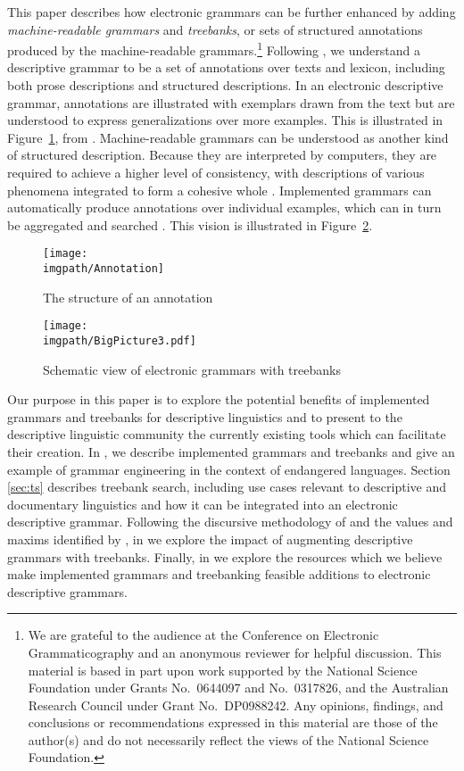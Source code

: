 This paper describes how electronic grammars can be further enhanced by
adding {\it machine-readable grammars} and {\it treebanks}, or sets of
structured annotations produced by the machine-readable
grammars.\footnote{We are grateful to the audience at the Conference on
  Electronic Grammaticography and an anonymous reviewer for helpful
  discussion.  This material is based in part upon work supported by the
  National Science Foundation under Grants No.\ 0644097 and No.\
  0317826, and the Australian Research Council under Grant No.\
  DP0988242.  Any opinions, findings, and conclusions or recommendations
  expressed in this material are those of the author(s) and do not
  necessarily reflect the views of the National Science Foundation.  }
Following \namecite{Good:04}, we understand a descriptive grammar to be
a set of annotations over texts and lexicon, including both prose
descriptions and structured descriptions.  In an electronic descriptive
grammar, annotations are illustrated with exemplars drawn from the text
but are understood to express generalizations over more examples.  This
is illustrated in Figure~\ref{fig:good}, from \citeboth{Good:04}.
Machine-readable grammars can be understood as another kind of
structured description.  Because they are interpreted by computers, they
are required to achieve a higher level of consistency, with descriptions
of various phenomena integrated to form a cohesive whole
\citep{Bender:08}. Implemented grammars can automatically produce
annotations over individual examples, which can in turn be aggregated
and searched \citep{Gho:Bir:10}.  This vision is illustrated in
Figure~\ref{fig:bigpicture}.


\begin{figure}[hbtp]
\centering
\texttt{[image: \\imgpath/Annotation]}
\caption{The structure of an annotation \protect\citep{Good:04}}
\label{fig:good}
\end{figure}

\begin{figure}
\centering
\texttt{[image: \\imgpath/BigPicture3.pdf]}
\caption{Schematic view of electronic grammars with treebanks}
\label{fig:bigpicture}
\end{figure}


Our purpose in this paper is to explore the potential benefits of
implemented grammars and treebanks for descriptive linguistics and to
present to the descriptive linguistic community the currently existing
tools which can facilitate their creation.  In \sref{sec:bg}, we
describe implemented grammars and treebanks and give an example of
grammar engineering in the context of endangered languages.
Section \ref{sec:ts} describes treebank search, including use cases relevant
to descriptive and documentary linguistics and how it can be
integrated into an electronic descriptive grammar.  Following the
discursive methodology of \namecite{Bir:Sim:03} and the values and
maxims identified by \namecite{Nordhoff:08}, in \sref{sec:vm} we
explore the impact of augmenting descriptive grammars with treebanks.
Finally, in \sref{sec:gt} we explore the resources which we believe make
implemented grammars and treebanking feasible additions to electronic
descriptive grammars.


